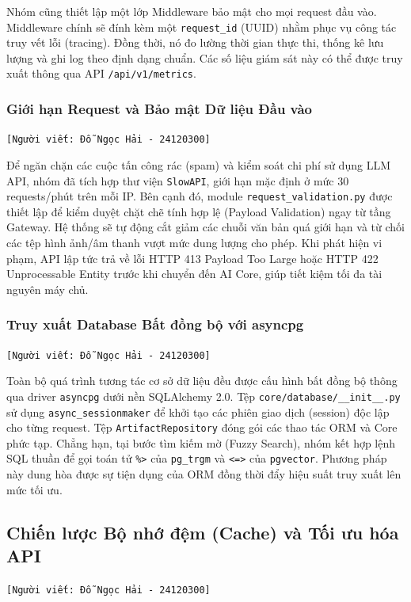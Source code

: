 Nhóm cũng thiết lập một lớp Middleware bảo mật cho mọi request đầu vào. Middleware chính sẽ đính kèm một \texttt{request\_id} (UUID) nhằm phục vụ công tác truy vết lỗi (tracing). Đồng thời, nó đo lường thời gian thực thi, thống kê lưu lượng và ghi log theo định dạng chuẩn. Các số liệu giám sát này có thể được truy xuất thông qua API \texttt{/api/v1/metrics}.

\subsubsection{Giới hạn Request và Bảo mật Dữ liệu Đầu vào}
\texttt{[Người viết: Đỗ Ngọc Hải - 24120300]}

Để ngăn chặn các cuộc tấn công rác (spam) và kiểm soát chi phí sử dụng LLM API, nhóm đã tích hợp thư viện \texttt{SlowAPI}, giới hạn mặc định ở mức 30 requests/phút trên mỗi IP. Bên cạnh đó, module \texttt{request\_validation.py} được thiết lập để kiểm duyệt chặt chẽ tính hợp lệ (Payload Validation) ngay từ tầng Gateway. Hệ thống sẽ tự động cắt giảm các chuỗi văn bản quá giới hạn và từ chối các tệp hình ảnh/âm thanh vượt mức dung lượng cho phép. Khi phát hiện vi phạm, API lập tức trả về lỗi HTTP 413 Payload Too Large hoặc HTTP 422 Unprocessable Entity trước khi chuyển đến AI Core, giúp tiết kiệm tối đa tài nguyên máy chủ.

\subsubsection{Truy xuất Database Bất đồng bộ với asyncpg}
\texttt{[Người viết: Đỗ Ngọc Hải - 24120300]}

Toàn bộ quá trình tương tác cơ sở dữ liệu đều được cấu hình bất đồng bộ thông qua driver \texttt{asyncpg} dưới nền SQLAlchemy 2.0. Tệp \texttt{core/database/\_\_init\_\_.py} sử dụng \texttt{async\_sessionmaker} để khởi tạo các phiên giao dịch (session) độc lập cho từng request. Tệp \texttt{ArtifactRepository} đóng gói các thao tác ORM và Core phức tạp. Chẳng hạn, tại bước tìm kiếm mờ (Fuzzy Search), nhóm kết hợp lệnh SQL thuần để gọi toán tử \texttt{\%>} của \texttt{pg\_trgm} và \texttt{<=>} của \texttt{pgvector}. Phương pháp này dung hòa được sự tiện dụng của ORM đồng thời đẩy hiệu suất truy xuất lên mức tối ưu.

\subsection{Chiến lược Bộ nhớ đệm (Cache) và Tối ưu hóa API}
\texttt{[Người viết: Đỗ Ngọc Hải - 24120300]}

